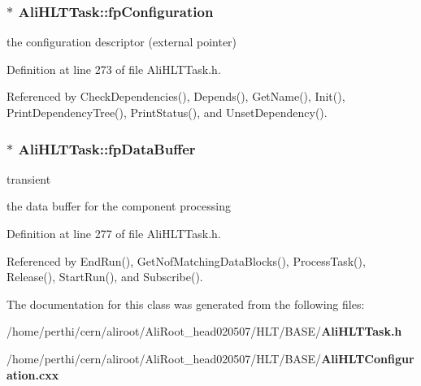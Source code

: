 \subsubsection{$\ast$ {\bf Ali\-HLTTask::fp\-Configuration}\hspace{0.3cm}{\tt  [private]}}\label{classAliHLTTask_r0}


the configuration descriptor (external pointer) 

Definition at line 273 of file Ali\-HLTTask.h.

Referenced by Check\-Dependencies(), Depends(), Get\-Name(), Init(), Print\-Dependency\-Tree(), Print\-Status(), and Unset\-Dependency().
\subsubsection{$\ast$ {\bf Ali\-HLTTask::fp\-Data\-Buffer}\hspace{0.3cm}{\tt  [private]}}\label{classAliHLTTask_r2}


transient 

the data buffer for the component processing 

Definition at line 277 of file Ali\-HLTTask.h.

Referenced by End\-Run(), Get\-Nof\-Matching\-Data\-Blocks(), Process\-Task(), Release(), Start\-Run(), and Subscribe().

The documentation for this class was generated from the following files:\begin{CompactItemize}
\item 
/home/perthi/cern/aliroot/Ali\-Root\_\-head020507/HLT/BASE/{\bf Ali\-HLTTask.h}\item 
/home/perthi/cern/aliroot/Ali\-Root\_\-head020507/HLT/BASE/{\bf Ali\-HLTConfiguration.cxx}\end{CompactItemize}
